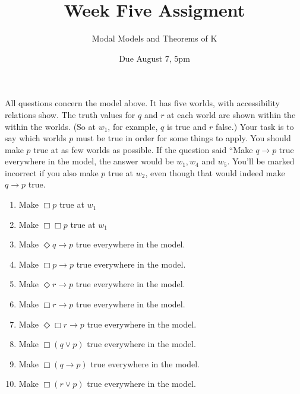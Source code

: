 \title{Week Five Assigment}
\author{Modal Models and Theorems of K}
\date{Due August 7, 5pm}


\begin{center}

\end{center}
All questions concern the model above. It has five worlds, with accessibility relations show. The truth values for $q$ and $r$ at each world are shown within the within the worlds. (So at $w_1$, for example, $q$ is true and $r$ false.) Your task is to say which worlds $p$ must be true in order for some things to apply. You should make $p$ true at as few worlds as possible. If the question said ``Make $q \rightarrow p$ true everywhere in the model, the answer would be $w_1, w_4$ and $w_5$. You'll be marked incorrect if you also make $p$ true at $w_2$, even though that would indeed make $q \rightarrow p$ true.

\begin{enumerate}
\item Make $\Box p$ true at $w_1$
\item Make $\Box \Box p$ true at $w_1$
\item Make $\Diamond q \rightarrow p$ true everywhere in the model.
\item Make $\Box p \rightarrow p$ true everywhere in the model.
\item Make $\Diamond r \rightarrow p$ true everywhere in the model.
\item Make $\Box r \rightarrow p$ true everywhere in the model.
\item Make $\Diamond \Box r \rightarrow p$ true everywhere in the model.
\item Make $\Box (q \vee p)$ true everywhere in the model.
\item Make $\Box (q \rightarrow p)$ true everywhere in the model.
\item Make $\Box (r \vee p)$ true everywhere in the model.
\end{enumerate}

